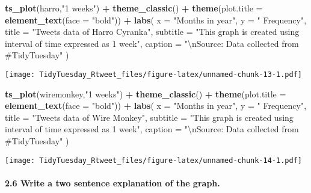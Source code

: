 \documentclass[]{article}
\newenvironment{Shaded}{\begin{snugshade}}{\end{snugshade}}
\newcommand{\CharTok}[1]{\textcolor[rgb]{0.31,0.60,0.02}{#1}}
\newcommand{\DataTypeTok}[1]{\textcolor[rgb]{0.13,0.29,0.53}{#1}}
\newcommand{\KeywordTok}[1]{\textcolor[rgb]{0.13,0.29,0.53}{\textbf{#1}}}
\newcommand{\NormalTok}[1]{#1}
\newcommand{\OperatorTok}[1]{\textcolor[rgb]{0.81,0.36,0.00}{\textbf{#1}}}
\newcommand{\StringTok}[1]{\textcolor[rgb]{0.31,0.60,0.02}{#1}}
\let\oldparagraph\paragraph
\renewcommand{\paragraph}[1]{\oldparagraph{#1}\mbox{}}
\begin{document}
\begin{Shaded}
\begin{Highlighting}[]
\KeywordTok{ts_plot}\NormalTok{(harro,}\StringTok{"1 weeks"}\NormalTok{) }\OperatorTok{+}\StringTok{ }\KeywordTok{theme_classic}\NormalTok{() }\OperatorTok{+}\StringTok{ }\KeywordTok{theme}\NormalTok{(}\DataTypeTok{plot.title =} \KeywordTok{element_text}\NormalTok{(}\DataTypeTok{face =} \StringTok{"bold"}\NormalTok{)) }\OperatorTok{+}\StringTok{ }\KeywordTok{labs}\NormalTok{(}
    \DataTypeTok{x =} \StringTok{"Months in year"}\NormalTok{, }\DataTypeTok{y =} \StringTok{" Frequency"}\NormalTok{,}
    \DataTypeTok{title =} \StringTok{"Tweets data of Harro Cyranka"}\NormalTok{,}
    \DataTypeTok{subtitle =} \StringTok{"This graph is created using interval of time expressed as 1 week"}\NormalTok{,}
    \DataTypeTok{caption =} \StringTok{"}\CharTok{\textbackslash{}n}\StringTok{Source: Data collected from #TidyTuesday"}
\NormalTok{  ) }
\end{Highlighting}
\end{Shaded}

\texttt{[image: TidyTuesday\_Rtweet\_files/figure-latex/unnamed-chunk-13-1.pdf]}

\begin{Shaded}
\begin{Highlighting}[]
\KeywordTok{ts_plot}\NormalTok{(wiremonkey,}\StringTok{"1 weeks"}\NormalTok{) }\OperatorTok{+}\StringTok{ }\KeywordTok{theme_classic}\NormalTok{() }\OperatorTok{+}\StringTok{ }\KeywordTok{theme}\NormalTok{(}\DataTypeTok{plot.title =} \KeywordTok{element_text}\NormalTok{(}\DataTypeTok{face =} \StringTok{"bold"}\NormalTok{)) }\OperatorTok{+}\StringTok{ }\KeywordTok{labs}\NormalTok{(}
    \DataTypeTok{x =} \StringTok{"Months in year"}\NormalTok{, }\DataTypeTok{y =} \StringTok{" Frequency"}\NormalTok{,}
    \DataTypeTok{title =} \StringTok{"Tweets data of Wire Monkey"}\NormalTok{,}
    \DataTypeTok{subtitle =} \StringTok{"This graph is created using interval of time expressed as 1 week"}\NormalTok{,}
    \DataTypeTok{caption =} \StringTok{"}\CharTok{\textbackslash{}n}\StringTok{Source: Data collected from #TidyTuesday"}
\NormalTok{  ) }
\end{Highlighting}
\end{Shaded}

\texttt{[image: TidyTuesday\_Rtweet\_files/figure-latex/unnamed-chunk-14-1.pdf]}

\hypertarget{write-a-two-sentence-explanation-of-the-graph.-1}{%
\paragraph{2.6 Write a two sentence explanation of the
graph.}\label{write-a-two-sentence-explanation-of-the-graph.-1}}
\end{document}
